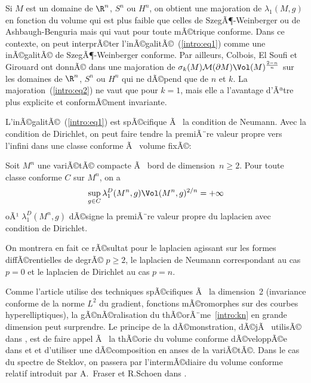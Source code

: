 \documentclass[11pt,a4paper]{smfart}
\begin{document}
\begin{rema}
Si $M$ est un domaine de $\R^n$, $S^n$ ou $H^n$, on obtient une majoration
de $\lambda_1(M,g)$ en fonction du volume qui est plus faible que celles
de SzegÃ¶-Weinberger ou de Ashbaugh-Benguria \cite{ab95} mais qui vaut pour
toute mÃ©trique conforme. Dans ce contexte, on peut interprÃ©ter
l'inÃ©galitÃ©~(\ref{intro:eq1}) comme une inÃ©galitÃ© de SzegÃ¶-Weinberger conforme.
Par ailleurs, Colbois, El Soufi et Girouard ont donnÃ© dans \cite{cesg11}
une majoration de $\sigma_k(M)\mathcal M(\partial M)
\Vol(M)^{\frac{2-n}n}$ sur les domaines de $\R^n$, $S^n$ ou $H^n$ qui ne
dÃ©pend que de $n$ et $k$. La majoration~(\ref{intro:eq2}) ne vaut que
pour $k=1$, mais elle a l'avantage d'Ãªtre plus explicite et
conformÃ©ment invariante.
\end{rema}

L'inÃ©galitÃ©~(\ref{intro:eq1}) est spÃ©cifique Ã  la condition
de Neumann. Avec la condition de Dirichlet, on peut faire tendre
la premiÃ¨re valeur propre vers l'infini dans une classe conforme Ã  volume fixÃ©:
\begin{theo}\label{intro:th3}
Soit $M^n$ une variÃ©tÃ© compacte Ã  bord de dimension~$n\geq 2$. Pour toute
classe conforme $C$ sur $M^n$, on a
$$\sup_{g\in C}\lambda_1^D(M^n,g)\Vol(M^n,g)^{2/n}=+\infty$$
oÃ¹ $\lambda_1^D(M^n,g)$ dÃ©signe la premiÃ¨re valeur propre du laplacien
avec condition de Dirichlet.
\end{theo}
On montrera en fait ce rÃ©sultat pour le laplacien agissant sur les
formes diffÃ©rentielles de degrÃ© $p\geq2$, le laplacien de Neumann
correspondant au cas $p=0$ et le laplacien de Dirichlet au cas $p=n$.

 Comme l'article \cite{kn10} utilise des techniques spÃ©cifiques Ã  la
dimension~2 (invariance conforme de la norme $L^2$ du gradient, fonctions
mÃ©romorphes sur des courbes hyperelliptiques), la gÃ©nÃ©ralisation du
thÃ©orÃ¨me~\ref{intro:kn} en grande dimension peut surprendre. Le principe de la
dÃ©monstration, dÃ©jÃ  utilisÃ© dans \cite{ja08}, est de faire appel Ã  la
thÃ©orie du volume conforme dÃ©veloppÃ©e dans \cite{ly82} et \cite{esi86}
et d'utiliser une dÃ©composition en anses de la variÃ©tÃ©. Dans le cas
du spectre de Steklov, on passera par l'intermÃ©diaire du volume
conforme relatif introduit par A.~Fraser et R.Schoen dans \cite{fs11}.
\end{document}
